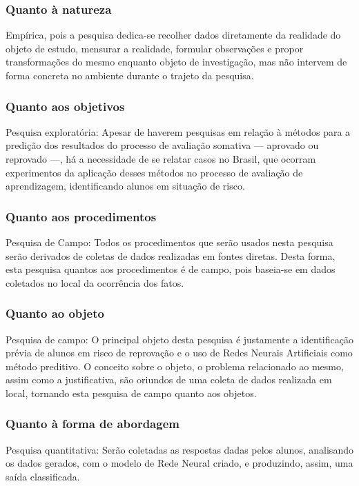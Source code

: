 \documentclass[
	12pt,				%
	openright,			%
	oneside,
	a4paper,			%
	english,			%
	french,				%
	spanish,			%
	brazil,				%
	]{abntex2}
\begin{document}
\subsubsection{Quanto à natureza}
Empírica, pois a pesquisa dedica-se recolher dados diretamente da realidade do objeto de estudo, mensurar a realidade, formular observações e propor transformações do mesmo enquanto objeto de investigação, mas não intervem de forma concreta no ambiente durante o trajeto da pesquisa.

\subsubsection{Quanto aos objetivos}
Pesquisa exploratória: Apesar de haverem pesquisas em relação à métodos para a predição dos resultados do processo de avaliação somativa --- aprovado ou reprovado ---, há a necessidade de se relatar casos no Brasil, que ocorram experimentos da aplicação desses métodos no processo de avaliação de aprendizagem, identificando alunos em situação de risco.

\subsubsection{Quanto aos procedimentos}
Pesquisa de Campo: Todos os procedimentos que serão usados nesta pesquisa serão derivados de coletas de dados realizadas em fontes diretas. Desta forma, esta pesquisa quantos aos procedimentos é de campo, pois baseia-se em dados coletados no local da ocorrência dos fatos.

\subsubsection{Quanto ao objeto}
Pesquisa de campo: O principal objeto desta pesquisa é justamente a identificação prévia de alunos em risco de reprovação e o uso de Redes Neurais Artificiais como método preditivo. O conceito sobre o objeto, o problema relacionado ao mesmo, assim como a justificativa, são oriundos de uma coleta de dados realizada em local, tornando esta pesquisa de campo quanto aos objetos.

\subsubsection{Quanto à forma de abordagem}
Pesquisa quantitativa: Serão coletadas as respostas dadas pelos alunos, analisando os dados gerados, com o modelo de Rede Neural criado, e produzindo, assim, uma saída classificada.
\end{document}
